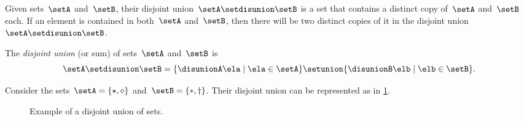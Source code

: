 \begin{comment}
Suppose that we are considering a hybrid car that contains two engines: an electric engine and an internal combustion engine.
Both can produce \transmuted{motion}, but each from a different source of energy.
The electric engine uses \transmuted{electric energy}; the internal combustion engine uses \transmuted{gasoline}.
The situation is as in \cref{fig:e14}.

\begin{figure}[h!]
	\centering
	\includesag{30_dpcatfig_e14}
	\caption{Alternative ways to generate $\mathsf{motion}$.}
	\label{fig:e14}
\end{figure}

From this we would like to conclude that we can obtain \textsf{motion} from \textbf{either} \textsf{gasoline} \textbf{or} \textsf{electric energy} (\cref{fig:e16b}).

\begin{figure}[h!]
	\centering
	\includesag{30_dpcatfig_e15}
	\caption{We can generate $\mathsf{motion}$ from either $\mathsf{gasoline}$ or $\mathsf{electric} \ \mathsf{energy}$.}
	\label{fig:e15}
\end{figure}

To define the idea of ``\textbf{either} \transmuted{food} \textbf{or} \transmuted{drink}'' we can refer to the idea of disjoint union of sets (\cref{def:disjoint-union}).
\end{comment}

Given sets~$\setA$ and~$\setB$, their disjoint union~$\setA \setdisunion \setB$ is a set that contains a distinct copy of~$\setA$ and~$\setB$ each.
If an element is contained in both~$\setA$ and~$\setB$, then there will be two distinct copies of it in the disjoint union~$\setA \setdisunion \setB$.

\begin{definition}
	\label{def:disjoint-union}
	The \emph{disjoint union} (or sum) of sets~$\setA$ and~$\setB$ is
	\begin{equation}
		\setA \setdisunion \setB=\{\disunionA\ela \mid \ela\in \setA\}\setunion\{\disunionB\elb \mid \elb\in \setB\}.
	\end{equation}
\end{definition}

\begin{example}
	Consider the sets~$\setA=\{\star, \diamond\}$ and~$\setB=\{\ast, \dagger\}$.
	Their disjoint union can be represented as in \cref{fig:disjoint}.
\end{example}
\begin{figure}[h!]
	\centering
	\caption{Example of a disjoint union of sets.}
	\label{fig:disjoint}
\end{figure}

